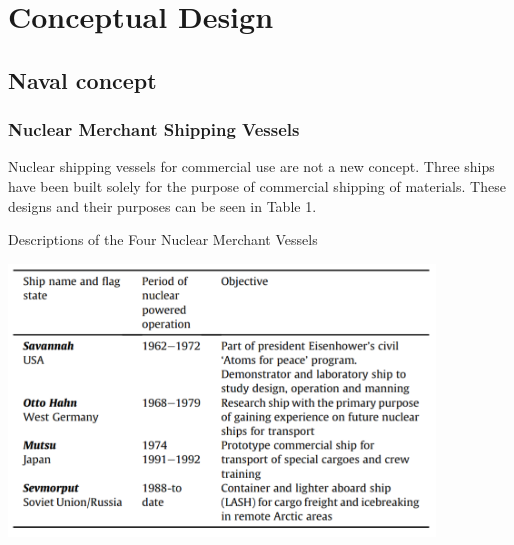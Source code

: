 \documentclass[12pt]{article}
\begin{document}





\section{Conceptual Design}
\subsection{Naval concept}
\subsubsection{Nuclear Merchant Shipping Vessels}
Nuclear shipping vessels for commercial use are not a new concept.  Three ships have been built solely for the purpose of commercial shipping of materials.  These designs and their purposes can be seen in Table 1.

\begin{table}[H]
\begin{center}
\caption{Descriptions of the Four Nuclear Merchant Vessels \cite{historic_ships}}
\label{t:KLT-40S2}  %
\includegraphics[width=0.85\textwidth]{four_ships} %
\end{center}
\end{table}
\end{document}
